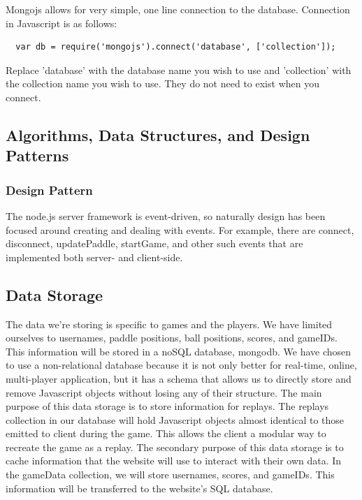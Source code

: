 \documentclass[letterpaper,12pt]{article}
\begin{document}
Mongojs allows for very simple, one line connection to the database. Connection in Javascript is as follows: 
\begin {verbatim}
  var db = require('mongojs').connect('database', ['collection']); 
\end{verbatim}
Replace 'database' with the database name you wish to use and 'collection' with the collection name you wish to use. They do not need to exist when you connect. 


\subsection{Algorithms, Data Structures, and Design Patterns}
\subsubsection{Design Pattern}
The node.js server framework is event-driven, so naturally design has been focused around creating and dealing with events.
For example, there are connect, disconnect, updatePaddle, startGame, and other such events that are implemented both server- and client-side.

\subsection{Data Storage}
The data we’re storing is specific to games and the players. We have limited ourselves to usernames, paddle positions, ball positions, scores, and gameIDs. This information will be stored in a noSQL database, mongodb. We have chosen to use a non-relational database because it is not only better for real-time, online, multi-player application, but it has a schema that allows us to directly store and remove Javascript objects without losing any of their structure. 
The main purpose of this data storage is to store information for replays. The replays collection in our database will hold Javascript objects almost identical to those emitted to client during the game. This allows the client a modular way to recreate the game as a replay.
The secondary purpose of this data storage is to cache information that the website will use to interact with their own data. In the gameData collection, we will store usernames, scores, and gameIDs. This information will be transferred to the website’s SQL database.  \\
\end{document}
